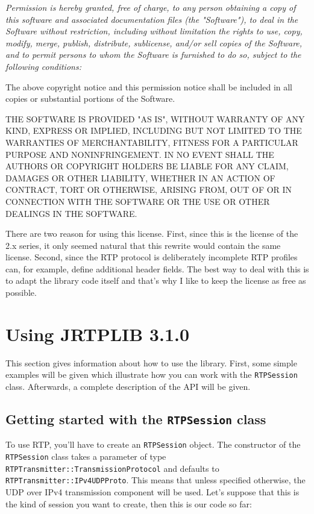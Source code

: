 \documentclass[12pt,a4paper]{article}
\newcommand{\jversion}{3.1.0}
\begin{document}
			{\em Permission is hereby granted, free of charge, to any person
			obtaining a copy of this software and associated documentation files
			(the "Software"), to deal in the Software without restriction,
			including without limitation the rights to use, copy, modify, merge,
			publish, distribute, sublicense, and/or sell copies of the Software,
			and to permit persons to whom the Software is furnished to do so,
			subject to the following conditions:

			The above copyright notice and this permission notice shall be
			included in all copies or substantial portions of the Software.

			THE SOFTWARE IS PROVIDED "AS IS", WITHOUT WARRANTY OF ANY
			KIND, EXPRESS OR IMPLIED, INCLUDING BUT NOT LIMITED TO THE
			WARRANTIES OF MERCHANTABILITY, FITNESS FOR A PARTICULAR PURPOSE AND
			NONINFRINGEMENT. IN NO EVENT SHALL THE AUTHORS OR COPYRIGHT HOLDERS
			BE LIABLE FOR ANY CLAIM, DAMAGES OR OTHER LIABILITY, WHETHER IN AN
			ACTION OF CONTRACT, TORT OR OTHERWISE, ARISING FROM, OUT OF OR IN
			CONNECTION WITH THE SOFTWARE OR THE USE OR OTHER DEALINGS IN THE
			SOFTWARE.}

		There are two reason for using this license. First, since this is the
		license of the 2.x series, it only seemed natural that this rewrite
		would contain the same license. Second, since the RTP protocol is
		deliberately incomplete RTP profiles can, for example, define additional
		header fields. The best way to deal with this is to adapt the library
		code itself and that's why I like to keep the license as free as
		possible.

	\section{Using JRTPLIB \jversion}
		
		This section gives information about how to use the library. First, some
		simple examples will be given which illustrate how you can work with the
		{\tt RTPSession} class. Afterwards, a complete description of the API
		will be given.

		\subsection{Getting started with the {\tt RTPSession} class}

			To use RTP, you'll have to create an {\tt RTPSession} object. The
			constructor of the {\tt RTPSession} class takes a parameter of
			type {\tt RTPTrans\-mitter::Trans\-mission\-Protocol} and defaults
			to {\tt RTPTrans\-mitter::IPv4UDPProto}. This means that unless
			specified otherwise, the UDP over IPv4 transmission component will
			be used. Let's suppose that this is the kind of session you want to
			create, then this is our code so far:
\end{document}
